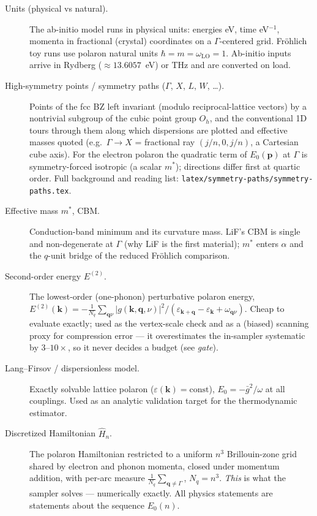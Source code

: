 \documentclass[11pt]{article}
\newcommand{\kv}{\mathbf{k}}
\newcommand{\qv}{\mathbf{q}}
\newcommand{\term}[1]{\item[#1.]}
\begin{document}
\begin{description}
\term{Units (physical vs natural)} The ab-initio model runs in physical units:
  energies eV, time eV$^{-1}$, momenta in fractional (crystal) coordinates on a
  $\Gamma$-centered grid. Fr\"ohlich toy runs use polaron natural units
  $\hbar=m=\omega_{\mathrm{LO}}=1$. Ab-initio inputs arrive in Rydberg
  ($\approx13.6057$~eV) or THz and are converted on load.

\term{High-symmetry points / symmetry paths ($\Gamma$, $X$, $L$, $W$, \dots)}
  Points of the fcc BZ left invariant (modulo reciprocal-lattice vectors) by a
  nontrivial subgroup of the cubic point group $O_{h}$, and the conventional 1D
  tours through them along which dispersions are plotted and effective masses
  quoted (e.g.\ $\Gamma\to X$ = fractional ray $(j/n,0,j/n)$, a Cartesian cube
  axis). For the electron polaron the quadratic term of $E_{0}(\mathbf{p})$ at
  $\Gamma$ is symmetry-forced isotropic (a scalar $m^{*}$); directions differ
  first at quartic order. Full background and reading list:
  \texttt{latex/symmetry-paths/symmetry-paths.tex}.

\term{Effective mass $m^{*}$, CBM} Conduction-band minimum and its curvature mass.
  LiF's CBM is single and non-degenerate at $\Gamma$ (why LiF is the first material);
  $m^{*}$ enters $\alpha$ and the $q$-unit bridge of the reduced Fr\"ohlich comparison.

\term{Second-order energy $E^{(2)}$} The lowest-order (one-phonon) perturbative
  polaron energy, $E^{(2)}(\kv)=-\frac{1}{N_{q}}\sum_{\qv\nu}
  |g(\kv,\qv,\nu)|^{2}/(\varepsilon_{\kv+\qv}-\varepsilon_{\kv}+\omega_{\qv\nu})$.
  Cheap to evaluate exactly; used as the vertex-scale check and as a (biased) scanning
  proxy for compression error --- it overestimates the in-sampler systematic by
  $3$--$10\times$, so it never decides a budget (see \emph{gate}).

\term{Lang--Firsov / dispersionless model} Exactly solvable lattice polaron
  ($\varepsilon(\kv)=\mathrm{const}$), $E_{0}=-\bar g^{2}/\omega$ at all couplings.
  Used as an analytic validation target for the thermodynamic estimator.

\term{Discretized Hamiltonian $\hat H_{n}$} The polaron Hamiltonian restricted to a
  uniform $n^{3}$ Brillouin-zone grid shared by electron and phonon momenta, closed
  under momentum addition, with per-arc measure $\frac{1}{N_{q}}\sum_{\qv\neq\Gamma}$,
  $N_{q}=n^{3}$. \emph{This} is what the sampler solves --- numerically exactly. All
  physics statements are statements about the sequence $E_{0}(n)$.


\end{description}
\end{document}
